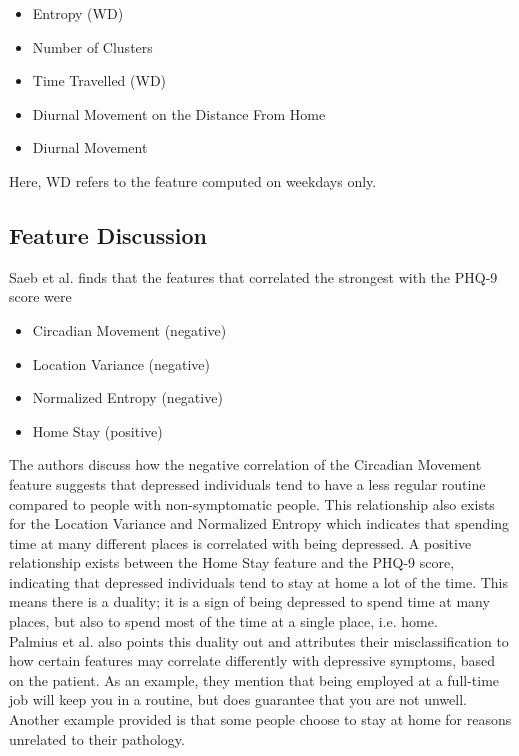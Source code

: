 \begin{itemize}
    \item Entropy (WD)
    \item Number of Clusters
    \item Time Travelled (WD)
    \item Diurnal Movement on the Distance From Home
    \item Diurnal Movement
\end{itemize}

Here, WD refers to the feature computed on weekdays only.\\

\subsection{Feature Discussion}
Saeb et al. finds that the features that correlated the strongest with the PHQ-9 score were 
\begin{itemize}
    \item Circadian Movement (negative)
    \item Location Variance (negative)
    \item Normalized Entropy (negative)
    \item Home Stay (positive)
\end{itemize}

The authors discuss how the negative correlation of the Circadian Movement feature suggests that depressed individuals tend to have a less regular routine compared to people with non-symptomatic people. This relationship also exists for the Location Variance and Normalized Entropy which indicates that spending time at many different places is correlated with being depressed. A positive relationship exists between the Home Stay feature and the PHQ-9 score, indicating that depressed individuals tend to stay at home a lot of the time. This means there is a duality; it is a sign of being depressed to spend time at many places, but also to spend most of the time at a single place, i.e. home.\\

Palmius et al. also points this duality out and attributes their misclassification to how certain features may correlate differently with depressive symptoms, based on the patient. As an example, they mention that being employed at a full-time job will keep you in a routine, but does guarantee that you are not unwell. Another example provided is that some people choose to stay at home for reasons unrelated to their pathology. 
